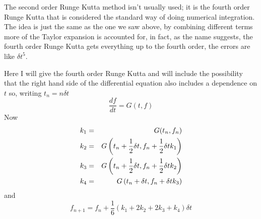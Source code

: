 \documentclass[12pt]{article}
\begin{document}
The second order Runge Kutta method isn't usually used; it is the
fourth order Runge Kutta that is considered the standard way of doing
numerical integration. The idea is just the same as the one we saw
above, by combining different terms more of the Taylor expansion is
accounted for, in fact, as the name suggests, the fourth order Runge
Kutta gets everything up to the fourth order, the errors are like
$\delta t^5$.

Here I will give the fourth order Runge Kutta and will include the
possibility that the right hand side of the differential equation also
includes a dependence on $t$ so, writing $t_n=n\delta t$
\begin{equation}
\frac{df}{dt}=G(t,f)
\end{equation}
Now
\begin{eqnarray}
k_1&=&G(t_n,f_n)\cr
k_2&=&G\left(t_n+\frac{1}{2}\delta t,f_n+\frac{1}{2}\delta tk_1\right)\cr 
k_3&=&G\left(t_n+\frac{1}{2}\delta t,f_n+\frac{1}{2}\delta tk_2\right)\cr 
k_4&=&G\left(t_n+\delta t,f_n+\delta tk_3\right) 
\end{eqnarray}
and 
\begin{equation}
f_{n+1}=f_n+\frac{1}{6}(k_1+2k_2+2k_3+k_4)\delta t
\end{equation}
\end{document}
